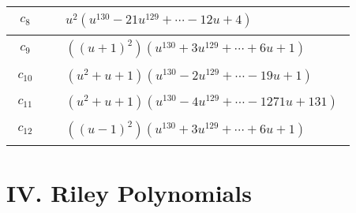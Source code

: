 \documentclass[1p]{elsarticle_modified}
\theoremstyle{definition}
\begin{document}
\begin{tabular}{m{50pt}|m{274pt}}
\hline $$\begin{aligned}c_{8}\end{aligned}$$&$\begin{aligned}
&u^2(u^{130}-21 u^{129}+\cdots-12 u+4)
\end{aligned}$\\
\hline $$\begin{aligned}c_{9}\end{aligned}$$&$\begin{aligned}
&((u+1)^2)(u^{130}+3 u^{129}+\cdots+6 u+1)
\end{aligned}$\\
\hline $$\begin{aligned}c_{10}\end{aligned}$$&$\begin{aligned}
&(u^2+u+1)(u^{130}-2 u^{129}+\cdots-19 u+1)
\end{aligned}$\\
\hline $$\begin{aligned}c_{11}\end{aligned}$$&$\begin{aligned}
&(u^2+u+1)(u^{130}-4 u^{129}+\cdots-1271 u+131)
\end{aligned}$\\
\hline $$\begin{aligned}c_{12}\end{aligned}$$&$\begin{aligned}
&((u-1)^2)(u^{130}+3 u^{129}+\cdots+6 u+1)
\end{aligned}$\\
\hline
\end{tabular}\newpage\renewcommand{\arraystretch}{1}
\centering \section*{ IV. Riley Polynomials}
\end{document}
